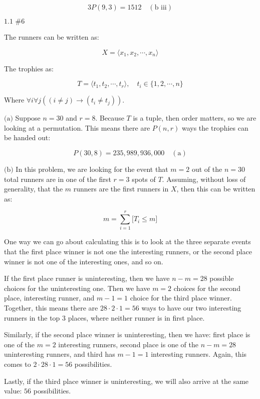 \documentclass{article}
\newcommand{\problem}[2]{$\boxed{\text{#1 \##2}}$}
\newcommand{\subproblem}[1]{$\boxed{\text{(#1)}}$}
\newcommand{\subsolution}[2]{\boxed{#2\quad(\text{#1})}}
\begin{document}
\begin{multicols*}{2}
\[
\subsolution{b iii}{3P(9,3)=1512}
\]

%
\problem{1.1}{6}

The runners can be written as:

\[
X=\langle x_1,x_2,\cdots,x_n\rangle
\]

The trophies as:

\[
T=\langle t_1,t_2,\cdots,t_r\rangle,\quad t_i\in\{1,2,\cdots,n\}
\]

Where $\forall{}i\forall{}j((i\ne{}j)\rightarrow(t_i\ne{}t_j))$.

%
\subproblem{a} Suppose $n=30$ and $r=8$. Because $T$ is a tuple, then
order matters, so we are looking at a permutation. This means there
are $P(n,r)$ ways the trophies can be handed out:

\[
\subsolution{a}{P(30,8)=235,989,936,000}
\]

%
\subproblem{b} In this problem, we are looking for the event that
$m=2$ out of the $n=30$ total runners are in one of the first $r=3$
spots of $T$. Assuming, without loss of generality, that the $m$
runners are the first runners in $X$, then this can be written as:

\[
m=\sum\limits_{i=1}^r \lbrack T_i\le m\rbrack
\]

\hspace{2em} One way we can go about calculating this is to look at the three
separate events that the first place winner is not one the interesting
runners, or the second place winner is not one of the interesting
ones, and so on.

\hspace{2em} If the first place runner is uninteresting, then we have $n-m=28$
possible choices for the uninteresting one. Then we have $m=2$ choices
for the second place, interesting runner, and $m-1=1$ choice for the
third place winner. Together, this means there are $28\cdot2\cdot1=56$
ways to have our two interesting runners in the top 3 places, where
neither runner is in first place.

\hspace{2em} Similarly, if the second place winner is uninteresting, then we have:
first place is one of the $m=2$ interesting runners, second place is
one of the $n-m=28$ uninteresting runners, and third has $m-1=1$
interesting runners. Again, this comes to $2\cdot28\cdot1=56$
possibilities.

\hspace{2em} Lastly, if the third place winner is uninteresting, we will also
arrive at the same value: $56$ possibilities.


\end{multicols*}
\end{document}
